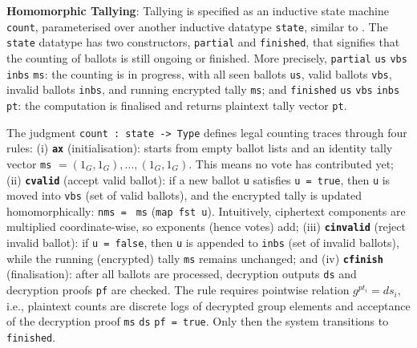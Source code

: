 \documentclass[sigconf,anonymous,review]{acmart}
\begin{document}
\textbf{Homomorphic Tallying}: Tallying is specified as an inductive state machine \texttt{count}, parameterised 
over another inductive datatype \texttt{state}, similar to \cite{10.1007/978-3-319-66107-0_26}. The \texttt{state} datatype has two constructors, \texttt{partial} and \texttt{finished}, that signifies that the counting of ballots is still ongoing or finished. More precisely, \texttt{partial} \texttt{us} \texttt{vbs} \texttt{inbs} \texttt{ms}: the counting is in progress, with all seen ballots \texttt{us}, valid ballots \texttt{vbs}, invalid ballots \texttt{inbs}, and running encrypted tally \texttt{ms}; and \texttt{finished} \texttt{us} \texttt{vbs} \texttt{inbs} \texttt{pt}: the computation is finalised and returns plaintext tally vector \texttt{pt}.

The judgment \texttt{count : state -> Type} defines legal counting traces through four rules: 
(i) \textbf{\texttt{ax}} (initialisation): starts from empty ballot lists and an identity tally vector \texttt{ms} $= (1_G,1_G),\ldots,(1_G,1_G)$. This means no vote has contributed yet; 
(ii) \textbf{\texttt{cvalid}} (accept valid ballot): if a new ballot \texttt{u} satisfies \texttt{} \texttt{u = true}, then \texttt{u} is moved into \texttt{vbs} (set of valid ballots), and the encrypted tally is updated homomorphically: \texttt{nms = } \texttt{ms} (\texttt{map fst u}). Intuitively, ciphertext components are multiplied coordinate-wise, so exponents (hence votes) add; 
(iii) \textbf{\texttt{cinvalid}} (reject invalid ballot): if \texttt{} \texttt{u = false}, then \texttt{u} is appended to \texttt{inbs} (set of invalid ballots), while the running (encrypted) tally \texttt{ms} remains unchanged; and 
(iv) \textbf{\texttt{cfinish}} (finalisation): after all ballots are processed, decryption outputs \texttt{ds} and decryption proofs \texttt{pf} are checked. The rule requires pointwise relation $g^{pt_i}=ds_i$, i.e., plaintext counts are discrete logs of decrypted group elements and acceptance of the decryption proof \texttt{} \texttt{ms} \texttt{ds} \texttt{pf = true}. Only then the system transitions to \texttt{finished}.
\end{document}

